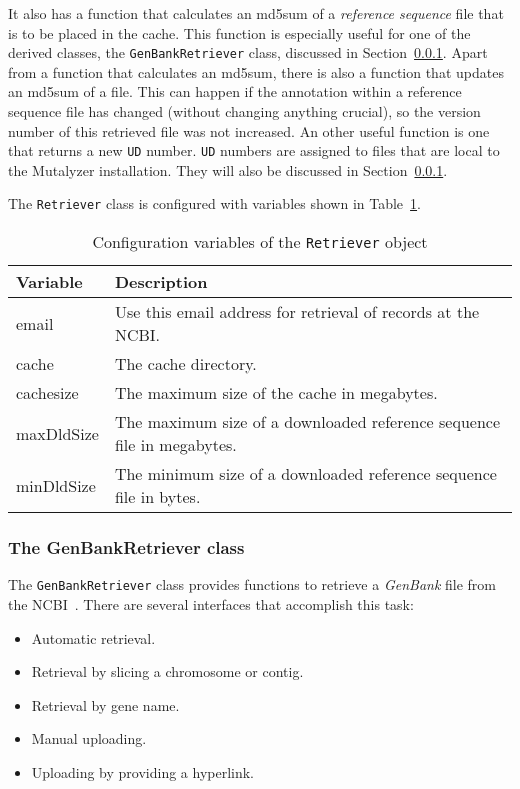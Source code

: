 \documentclass{article}
\begin{document}
It also has a function that calculates an md5sum of a \emph{reference sequence}
file that is to be placed in the cache. This function is especially useful for
one of the derived classes, the \texttt{GenBankRetriever} class, discussed
in Section~\ref{subsubsec:genbankretriever}. Apart from a function that calculates an md5sum, there is also a
function that updates an md5sum of a file. This can happen if the annotation
within a reference sequence file has changed (without changing anything
crucial), so the version number of this retrieved file was not increased. An
other useful function is one that returns a new \texttt{UD} number. \texttt{UD}
numbers are assigned to files that are local to the Mutalyzer installation.
They will also be discussed in Section~\ref{subsubsec:genbankretriever}. 

The \texttt{Retriever} class is configured with variables shown in
Table~\ref{tab:retrieverconfig}.

\begin{table}[H]
\begin{center}
\begin{tabular}{l|p{9cm}}
Variable   & Description \\
\hline
email      & Use this email address for retrieval of records at the NCBI. \\
cache      & The cache directory. \\
cachesize  & The maximum size of the cache in megabytes. \\
maxDldSize & The maximum size of a downloaded reference sequence file in
             megabytes. \\
minDldSize & The minimum size of a downloaded reference sequence file in bytes.
\end{tabular}
\caption{Configuration variables of the \texttt{Retriever} object} 
\label{tab:retrieverconfig}
\end{center}
\end{table}

\subsubsection{The GenBankRetriever class} \label{subsubsec:genbankretriever}
The \texttt{GenBankRetriever} class provides functions to retrieve a
\emph{GenBank} file from the NCBI~\cite{NCBI}. There are several interfaces
that accomplish this task: 

\begin{itemize}
\item Automatic retrieval.
\item Retrieval by slicing a chromosome or contig.
\item Retrieval by gene name.
\item Manual uploading.
\item Uploading by providing a hyperlink.
\end{itemize}
\end{document}
